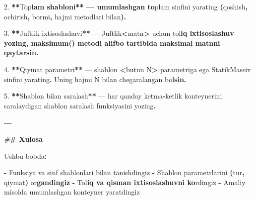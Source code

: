 \documentclass[a4paper,11pt,twoside,openright]{book}
\newenvironment{Shaded}{\begin{snugshade}}{\end{snugshade}}
\newcommand{\CharTok}[1]{\textcolor[rgb]{0.31,0.60,0.02}{#1}}
\newcommand{\ErrorTok}[1]{\textcolor[rgb]{0.64,0.00,0.00}{\textbf{#1}}}
\newcommand{\FloatTok}[1]{\textcolor[rgb]{0.00,0.00,0.81}{#1}}
\newcommand{\NormalTok}[1]{#1}
\newcommand{\OperatorTok}[1]{\textcolor[rgb]{0.81,0.36,0.00}{\textbf{#1}}}
\newcommand{\PreprocessorTok}[1]{\textcolor[rgb]{0.56,0.35,0.01}{\textit{#1}}}
\begin{document}
\begin{Shaded}
\begin{Highlighting}[]
\FloatTok{2.} \OperatorTok{**}\ErrorTok{\textasciigrave{}}\NormalTok{To}\CharTok{\textquotesingle{}p}\ErrorTok{lam\textasciigrave{} shabloni** — umumlashgan to}\CharTok{\textquotesingle{}}\NormalTok{plam sinfini yarating }\OperatorTok{(}\ErrorTok{\textasciigrave{}}\NormalTok{qoshish}\ErrorTok{\textasciigrave{}}\OperatorTok{,} \ErrorTok{\textasciigrave{}}\NormalTok{ochirish}\ErrorTok{\textasciigrave{}}\OperatorTok{,} \ErrorTok{\textasciigrave{}}\NormalTok{bormi}\ErrorTok{\textasciigrave{}}\OperatorTok{,} \ErrorTok{\textasciigrave{}}\NormalTok{hajmi}\ErrorTok{\textasciigrave{}}\NormalTok{ metodlari bilan}\OperatorTok{).}

\FloatTok{3.} \OperatorTok{**}\ErrorTok{\textasciigrave{}}\NormalTok{Juftlik}\ErrorTok{\textasciigrave{}}\NormalTok{ ixtisoslashuvi}\OperatorTok{**}\NormalTok{ — }\ErrorTok{\textasciigrave{}}\NormalTok{Juftlik}\OperatorTok{\textless{}}\NormalTok{matn}\OperatorTok{\textgreater{}}\ErrorTok{\textasciigrave{}}\NormalTok{ uchun to}\CharTok{\textquotesingle{}l}\ErrorTok{iq ixtisoslashuv yozing, \textasciigrave{}maksimum()\textasciigrave{} metodi alifbo tartibida maksimal matnni qaytarsin.}

\FloatTok{4.} \OperatorTok{**}\NormalTok{Qiymat parametri}\OperatorTok{**}\NormalTok{ — }\ErrorTok{\textasciigrave{}}\NormalTok{shablon }\OperatorTok{\textless{}}\NormalTok{butun N}\OperatorTok{\textgreater{}}\ErrorTok{\textasciigrave{}}\NormalTok{ parametriga ega }\ErrorTok{\textasciigrave{}}\NormalTok{StatikMassiv}\ErrorTok{\textasciigrave{}}\NormalTok{ sinfini yarating}\OperatorTok{.}\NormalTok{ Uning hajmi N bilan chegaralangan bo}\CharTok{\textquotesingle{}l}\ErrorTok{sin.}

\FloatTok{5.} \OperatorTok{**}\NormalTok{Shablon bilan saralash}\OperatorTok{**}\NormalTok{ — har qanday ketma}\OperatorTok{{-}}\NormalTok{ketlik konteynerini saralaydigan shablon }\ErrorTok{\textasciigrave{}}\NormalTok{saralash}\ErrorTok{\textasciigrave{}}\NormalTok{ funksiyasini yozing}\OperatorTok{.}

\OperatorTok{{-}{-}{-}}

\PreprocessorTok{\#}\ErrorTok{\# Xulosa}

\NormalTok{Ushbu bobda}\OperatorTok{:}

\OperatorTok{{-}}\NormalTok{ Funksiya va sinf shablonlari bilan tanishdingiz}
\OperatorTok{{-}}\NormalTok{ Shablon parametrlarini }\OperatorTok{(}\NormalTok{tur}\OperatorTok{,}\NormalTok{ qiymat}\OperatorTok{)}\NormalTok{ o}\CharTok{\textquotesingle{}r}\ErrorTok{gandingiz}
\OperatorTok{{-}}\NormalTok{ To}\CharTok{\textquotesingle{}l}\ErrorTok{iq va qisman ixtisoslashuvni ko}\CharTok{\textquotesingle{}}\NormalTok{rdingiz}
\OperatorTok{{-}}\NormalTok{ Amaliy misolda umumlashgan konteyner yaratdingiz}


\end{Highlighting}
\end{Shaded}
\end{document}
